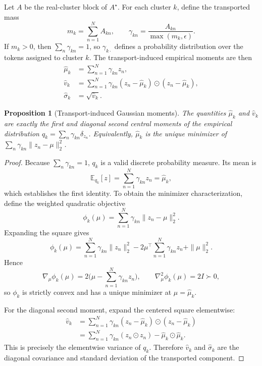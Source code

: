 \documentclass[journal]{IEEEtran}
\newtheorem{proposition}{Proposition}
\begin{document}
Let \(A\) be the real-cluster block of \(A^\star\). For each cluster \(k\), define the transported mass
\[
m_k = \sum_{n=1}^N A_{kn},
\qquad
\gamma_{kn} = \frac{A_{kn}}{\max(m_k,\epsilon)}.
\]
If \(m_k > 0\), then \(\sum_n \gamma_{kn} = 1\), so \(\gamma_{k\cdot}\) defines a probability distribution over the tokens assigned to cluster \(k\). The transport-induced empirical moments are then
\begin{align}
\hat{\mu}_k &= \sum_{n=1}^N \gamma_{kn} z_n, \label{eq:mu_hat}\\
\hat{v}_k &= \sum_{n=1}^N \gamma_{kn} (z_n - \hat{\mu}_k) \odot (z_n - \hat{\mu}_k), \label{eq:var_hat}\\
\hat{\sigma}_k &= \sqrt{\hat{v}_k}. \label{eq:sigma_hat}
\end{align}

\begin{proposition}[Transport-induced Gaussian moments]
The quantities \(\hat{\mu}_k\) and \(\hat{v}_k\) are exactly the first and diagonal second central moments of the empirical distribution \(q_k = \sum_n \gamma_{kn}\delta_{z_n}\). Equivalently, \(\hat{\mu}_k\) is the unique minimizer of \(\sum_n \gamma_{kn}\|z_n-\mu\|_2^2\).
\end{proposition}
\begin{proof}
Because \(\sum_n \gamma_{kn}=1\), \(q_k\) is a valid discrete probability measure. Its mean is
\[
\mathbb{E}_{q_k}[z] = \sum_{n=1}^N \gamma_{kn} z_n = \hat{\mu}_k,
\]
which establishes the first identity. To obtain the minimizer characterization, define the weighted quadratic objective
\[
\phi_k(\mu) = \sum_{n=1}^N \gamma_{kn}\|z_n-\mu\|_2^2.
\]
Expanding the square gives
\[
\phi_k(\mu)
= \sum_{n=1}^N \gamma_{kn}\|z_n\|_2^2 - 2\mu^\top\sum_{n=1}^N \gamma_{kn}z_n + \|\mu\|_2^2.
\]
Hence
\[
\nabla_\mu \phi_k(\mu) = 2\Big(\mu - \sum_{n=1}^N \gamma_{kn}z_n\Big),
\qquad
\nabla_\mu^2 \phi_k(\mu) = 2I \succ 0,
\]
so \(\phi_k\) is strictly convex and has a unique minimizer at \(\mu = \hat{\mu}_k\).

For the diagonal second moment, expand the centered square elementwise:
\begin{align}
\hat{v}_k
&= \sum_{n=1}^N \gamma_{kn}(z_n-\hat{\mu}_k)\odot(z_n-\hat{\mu}_k) \nonumber\\
&= \sum_{n=1}^N \gamma_{kn}(z_n\odot z_n) - \hat{\mu}_k\odot\hat{\mu}_k.
\end{align}
This is precisely the elementwise variance of \(q_k\). Therefore \(\hat{v}_k\) and \(\hat{\sigma}_k\) are the diagonal covariance and standard deviation of the transported component.

\end{proof}
\end{document}
